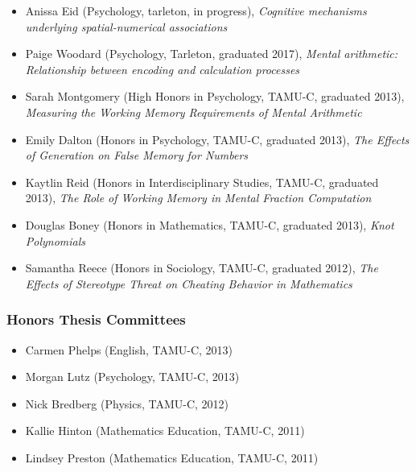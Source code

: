 \documentclass[article,10pt]{article}
\begin{document}
\begin{itemize}
\item Anissa Eid (Psychology, tarleton, in progress), \emph{Cognitive mechanisms underlying spatial-numerical associations}
\item Paige Woodard (Psychology, Tarleton, graduated 2017), \emph{Mental arithmetic: Relationship between encoding and calculation processes}
\item Sarah Montgomery (High Honors in Psychology, TAMU-C, graduated 2013), \emph{Measuring the Working Memory Requirements of Mental Arithmetic}
\item Emily Dalton (Honors in Psychology, TAMU-C, graduated 2013), \emph{The Effects of Generation on False Memory for Numbers}
\item Kaytlin Reid (Honors in Interdisciplinary Studies, TAMU-C, graduated 2013), \emph{The Role of Working Memory in Mental Fraction Computation}
\item Douglas Boney (Honors in Mathematics, TAMU-C, graduated 2013), \emph{Knot Polynomials}
\item Samantha Reece (Honors in Sociology, TAMU-C, graduated 2012), \emph{The Effects of Stereotype Threat on Cheating Behavior in Mathematics}
\end{itemize}

\subsubsection*{Honors Thesis Committees}
\label{sec:org6afc99e}

\begin{itemize}
\item Carmen Phelps (English, TAMU-C, 2013)
\item Morgan Lutz (Psychology, TAMU-C, 2013)
\item Nick Bredberg (Physics, TAMU-C, 2012)
\item Kallie Hinton (Mathematics Education, TAMU-C, 2011)
\item Lindsey Preston (Mathematics Education, TAMU-C, 2011)
\end{itemize}
\end{document}

